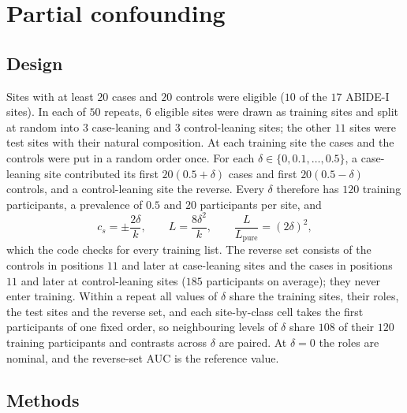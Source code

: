 \section{Partial confounding}\label{app:partial}

\subsection{Design}

Sites with at least $20$ cases and $20$ controls were eligible ($10$ of the $17$ ABIDE-I sites). In each of $50$ repeats, $6$ eligible sites were drawn as training sites and split at random into $3$ case-leaning and $3$ control-leaning sites; the other $11$ sites were test sites with their natural composition. At each training site the cases and the controls were put in a random order once. For each $\delta\in\{0,0.1,\dots,0.5\}$, a case-leaning site contributed its first $20(0.5+\delta)$ cases and first $20(0.5-\delta)$ controls, and a control-leaning site the reverse. Every $\delta$ therefore has $120$ training participants, a prevalence of $0.5$ and $20$ participants per site, and
\begin{equation}
c_s=\pm\frac{2\delta}{k},\qquad L=\frac{8\delta^2}{k},\qquad \frac{L}{L_{\mathrm{pure}}}=(2\delta)^2 ,
\end{equation}
which the code checks for every training list. The reverse set consists of the controls in positions $11$ and later at case-leaning sites and the cases in positions $11$ and later at control-leaning sites ($185$ participants on average); they never enter training. Within a repeat all values of $\delta$ share the training sites, their roles, the test sites and the reverse set, and each site-by-class cell takes the first participants of one fixed order, so neighbouring levels of $\delta$ share $108$ of their $120$ training participants and contrasts across $\delta$ are paired. At $\delta=0$ the roles are nominal, and the reverse-set AUC is the reference value.

\subsection{Methods}

